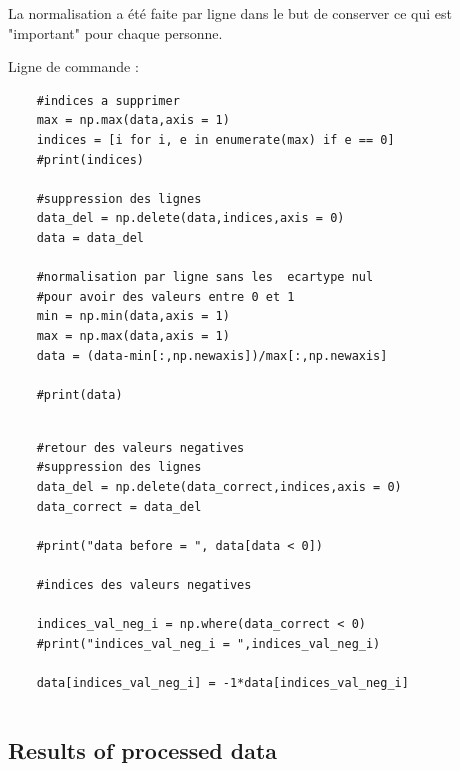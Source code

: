 \documentclass[12pt]{article}
\begin{document}
La normalisation a été faite par ligne dans le but de conserver ce qui est "important" pour chaque personne. 

Ligne de  commande : 

\begin{lstlisting}
    #indices a supprimer
    max = np.max(data,axis = 1)
    indices = [i for i, e in enumerate(max) if e == 0]
    #print(indices)
    
    #suppression des lignes
    data_del = np.delete(data,indices,axis = 0)
    data = data_del
    
    #normalisation par ligne sans les  ecartype nul 
    #pour avoir des valeurs entre 0 et 1
    min = np.min(data,axis = 1)
    max = np.max(data,axis = 1)
    data = (data-min[:,np.newaxis])/max[:,np.newaxis]
    
    #print(data)
\end{lstlisting}


\begin{lstlisting}

    #retour des valeurs negatives
    #suppression des lignes
    data_del = np.delete(data_correct,indices,axis = 0)
    data_correct = data_del
    
    #print("data before = ", data[data < 0])
    
    #indices des valeurs negatives
    
    indices_val_neg_i = np.where(data_correct < 0)
    #print("indices_val_neg_i = ",indices_val_neg_i)
    
    data[indices_val_neg_i] = -1*data[indices_val_neg_i]
\end{lstlisting}


\begin{lstlisting}

\end{lstlisting}

\subsection{Results of processed data}
\end{document}

